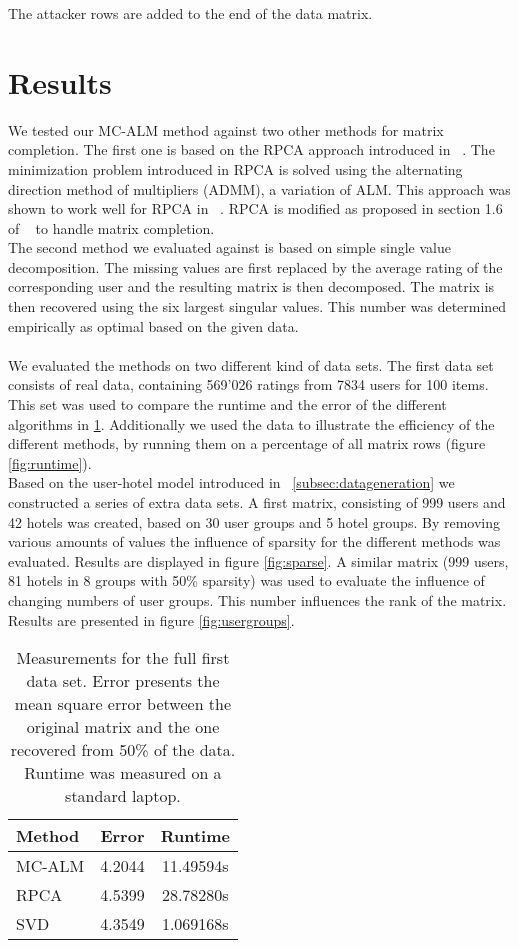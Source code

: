 \documentclass[10pt,conference,compsocconf]{IEEEtran}
\begin{document}
The attacker rows are added to the end of the data matrix.


\section{Results}
We tested our MC-ALM method against two other methods for matrix completion. The first one is based on the RPCA approach introduced in ~\cite{rpcapaper}. The minimization problem introduced in RPCA is solved using the alternating direction method of multipliers (ADMM), a variation of ALM. This approach was shown to work well for RPCA in ~\cite{rpcaalgo}. RPCA is modified as proposed in section 1.6 of ~\cite{rpcapaper} to handle matrix completion.\\
The second method we evaluated against is based on simple single value decomposition. The missing values are first replaced by the average rating of the corresponding user and the resulting matrix is then decomposed. The matrix is then recovered using the six largest singular values. This number was determined empirically as optimal based on the given data.

\paragraph{}
We evaluated the methods on two different kind of data sets. The first data set consists of real data, containing 569'026 ratings from 7834 users for 100 items. This set was used to compare the runtime and the error of the different algorithms in \ref{tab:overview}. Additionally we used the data to illustrate the efficiency of the different methods, by running them on a percentage of all matrix rows (figure \ref{fig:runtime}).\\
Based on the user-hotel model introduced in ~\ref{subsec:datageneration} we constructed a series of extra data sets. A first matrix, consisting of 999 users and 42 hotels was created, based on 30 user groups and 5 hotel groups. By removing various amounts of values the influence of sparsity for the different methods was evaluated. Results are displayed in figure \ref{fig:sparse}. A similar matrix (999 users, 81 hotels in 8 groups with 50\% sparsity) was used to evaluate the influence of changing numbers of user groups. This number influences the rank of the matrix. Results are presented in figure \ref{fig:usergroups}.

\begin{table}%
\centering
\begin{tabular}{|l|c|c|}
\hline
Method & Error & Runtime\\
\hline
MC-ALM & 4.2044 & 11.49594s\\
RPCA & 4.5399 & 28.78280s\\
SVD & 4.3549 & 1.069168s\\
\hline
\end{tabular}
\caption{Measurements for the full first data set. Error presents the mean square error between the original matrix and the one recovered from 50\% of the data. Runtime was measured on a standard laptop.}
\label{tab:overview}
\end{table}
\end{document}
